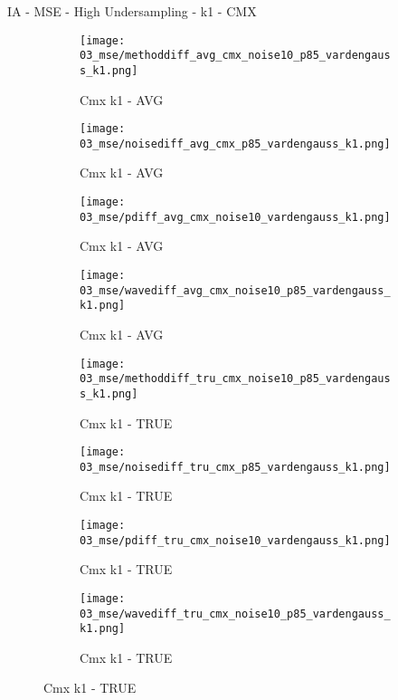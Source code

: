 \documentclass{beamer}
\begin{document}
\begin{frame}{IA - MSE - High Undersampling - k1 - CMX}{}
\begin{figure}
\begin{subfigure}{0.24\textwidth}
\texttt{[image: 03\_mse/methoddiff\_avg\_cmx\_noise10\_p85\_vardengauss\_k1.png]}
\vspace{-20pt}
\caption*{\tiny Cmx k1 - AVG}
\end{subfigure}
\begin{subfigure}{0.24\textwidth}
\texttt{[image: 03\_mse/noisediff\_avg\_cmx\_p85\_vardengauss\_k1.png]}
\vspace{-20pt}
\caption*{\tiny Cmx k1 - AVG}
\end{subfigure}
\begin{subfigure}{0.24\textwidth}
\texttt{[image: 03\_mse/pdiff\_avg\_cmx\_noise10\_vardengauss\_k1.png]}
\vspace{-20pt}
\caption*{\tiny Cmx k1 - AVG}
\end{subfigure}
\begin{subfigure}{0.24\textwidth}
\texttt{[image: 03\_mse/wavediff\_avg\_cmx\_noise10\_p85\_vardengauss\_k1.png]}
\vspace{-20pt}
\caption*{\tiny Cmx k1 - AVG}
\end{subfigure}

\begin{subfigure}{0.24\textwidth}
\texttt{[image: 03\_mse/methoddiff\_tru\_cmx\_noise10\_p85\_vardengauss\_k1.png]}
\vspace{-20pt}
\caption*{\tiny Cmx k1 - TRUE}
\end{subfigure}
\begin{subfigure}{0.24\textwidth}
\texttt{[image: 03\_mse/noisediff\_tru\_cmx\_p85\_vardengauss\_k1.png]}
\vspace{-20pt}
\caption*{\tiny Cmx k1 - TRUE}
\end{subfigure}
\begin{subfigure}{0.24\textwidth}
\texttt{[image: 03\_mse/pdiff\_tru\_cmx\_noise10\_vardengauss\_k1.png]}
\vspace{-20pt}
\caption*{\tiny Cmx k1 - TRUE}
\end{subfigure}
\begin{subfigure}{0.24\textwidth}
\texttt{[image: 03\_mse/wavediff\_tru\_cmx\_noise10\_p85\_vardengauss\_k1.png]}
\vspace{-20pt}
\caption*{\tiny Cmx k1 - TRUE}
\end{subfigure}
\end{figure}
\end{frame}
\end{document}
